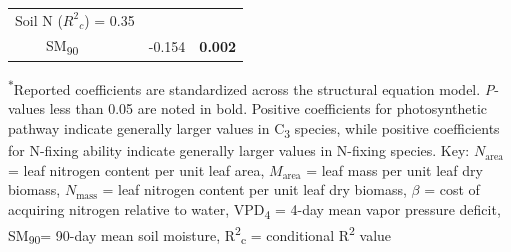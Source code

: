 \begin{table}
\begin{tabular}{p{0.5cm}p{3cm}p{1.5cm}p{1.5cm}}
            \multicolumn{2}{l}{Soil N ($R^2{}_c$) = 0.35} && \\
            & \multicolumn{1}{l}{SM\textsubscript{90}} & \multicolumn{1}{r}{-0.154} & \multicolumn{1}{r}{\textbf{0.002}} \\
            \hline

        \end{tabular}%
        \label{tab:table4.5}
    \end{table}
\begin{singlespace}
    \noindent \textsuperscript{$*$}Reported coefficients are standardized across the structural equation model. \textit{P}-values less than 0.05 are noted in bold. Positive coefficients for photosynthetic pathway indicate generally larger values in C\textsubscript{3} species, while positive coefficients for N-fixing ability indicate generally larger values in N-fixing species. Key: $N_\mathrm{area}$ = leaf nitrogen content per unit leaf area, $M_\mathrm{area}$ = leaf mass per unit leaf dry biomass, $N_\mathrm{mass}$ = leaf nitrogen content per unit leaf dry biomass, $\beta$ = cost of acquiring nitrogen relative to water, VPD\textsubscript{4} = 4-day mean vapor pressure deficit, SM\textsubscript{90}= 90-day mean soil moisture, R\textsuperscript{2}\textsubscript{c} = conditional R\textsuperscript{2} value
\end{singlespace}
\clearpage

